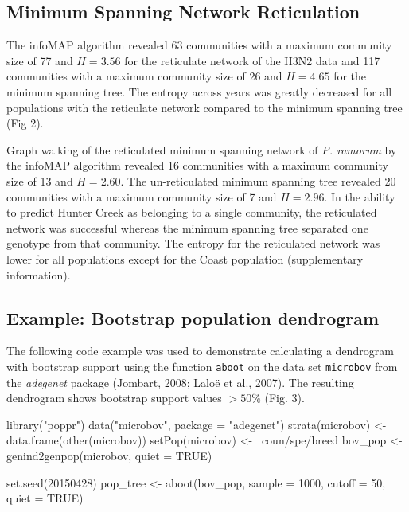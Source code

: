 \documentclass{frontiersSCNS} %
\newenvironment{CodeChunk}{}{}
\begin{document}
\subsection*{Minimum Spanning Network
Reticulation}\label{minimum-spanning-network-reticulation}

The infoMAP algorithm revealed 63 communities with a maximum community
size of 77 and \(H = 3.56\) for the reticulate network of the H3N2 data
and 117 communities with a maximum community size of 26 and \(H = 4.65\)
for the minimum spanning tree. The entropy across years was greatly
decreased for all populations with the reticulate network compared to
the minimum spanning tree (Fig 2).

Graph walking of the reticulated minimum spanning network of \emph{P.
ramorum} by the infoMAP algorithm revealed 16 communities with a maximum
community size of 13 and \(H = 2.60\). The un-reticulated minimum
spanning tree revealed 20 communities with a maximum community size of 7
and \(H = 2.96\). In the ability to predict Hunter Creek as belonging to
a single community, the reticulated network was successful whereas the
minimum spanning tree separated one genotype from that community. The
entropy for the reticulated network was lower for all populations except
for the Coast population (supplementary information).

\subsection*{Example: Bootstrap population
dendrogram}\label{example-bootstrap-population-dendrogram}

The following code example was used to demonstrate calculating a
dendrogram with bootstrap support using the function \texttt{aboot} on
the data set \texttt{microbov} from the \emph{adegenet} package
(Jombart, 2008; Lalo{ë} et al., 2007). The resulting dendrogram shows
bootstrap support values \(>50\%\) (Fig. 3).

\begin{CodeChunk}
\begin{CodeInput}
library("poppr")
data("microbov", package = "adegenet") 
strata(microbov) <- data.frame(other(microbov)) 
setPop(microbov) <- ~coun/spe/breed 
bov_pop <- genind2genpop(microbov, quiet = TRUE) 

set.seed(20150428)
pop_tree <- aboot(bov_pop, sample = 1000, cutoff = 50, quiet = TRUE)
\end{CodeInput}
\end{CodeChunk}
\end{document}
